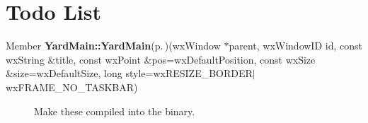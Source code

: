 \section{Todo List}\label{todo}
\label{_todo000002}
 \begin{description}
\item[Member {\bf Yard\-Main::Yard\-Main}{\rm (p.\,\pageref{classYardMain_a0})}(wx\-Window $\ast$parent, wx\-Window\-ID id, const wx\-String \&title, const wx\-Point \&pos=wx\-Default\-Position, const wx\-Size \&size=wx\-Default\-Size, long style=wx\-RESIZE\_\-BORDER$|$wx\-FRAME\_\-NO\_\-TASKBAR) ]Make these compiled into the binary.\end{description}
